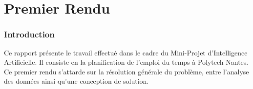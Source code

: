 \part{Premier Rendu}
\section{Introduction}
Ce rapport présente le travail effectué dans le cadre du Mini-Projet d'Intelligence Artificielle.
Il consiste en la planification de l'emploi du temps à Polytech Nantes.
Ce premier rendu s'attarde sur la résolution générale du problème, entre l'analyse des données ainsi qu'une conception de solution.


